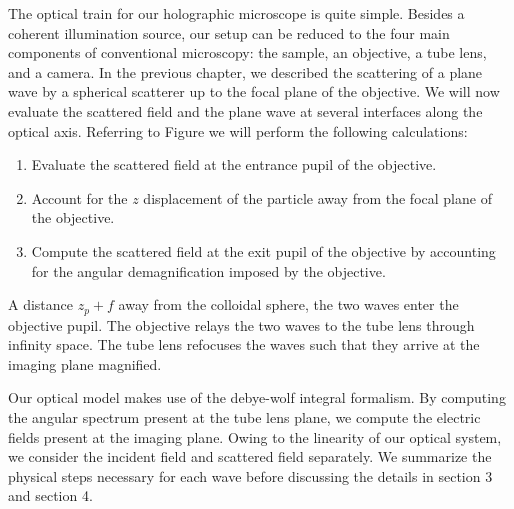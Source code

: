 
The optical train for our holographic microscope is quite simple.
Besides a coherent illumination source, our setup can be reduced to the four
main components of conventional microscopy: the sample, an objective,
a tube lens, and a camera. In the previous chapter, we described the
scattering of a plane wave by a spherical scatterer up to the focal plane
of the objective. We will now evaluate the scattered field and the plane
wave at several interfaces along the optical axis. Referring to
Figure %
we will perform the following calculations:
\begin{enumerate}
\item Evaluate the scattered field at the entrance pupil of the objective.
\item Account for the  $z$ displacement of the particle away from the focal
  plane of the objective.
\item Compute the scattered field at the exit pupil of the objective by accounting
  for the angular demagnification imposed by the objective.
\end{enumerate}


A distance $z_p + f$ away from the colloidal sphere, the two waves enter the
objective pupil. The objective relays the two waves to the tube lens through
infinity space. The tube lens refocuses the waves such that they arrive at the imaging
plane magnified.

Our optical model makes use of the debye-wolf integral formalism. By computing the
angular spectrum present at the tube lens plane, we compute the electric fields
present at the imaging plane. Owing to the linearity of our optical system,
we consider the incident field and scattered field separately. We summarize the physical
steps necessary for each wave before discussing the details in section 3 and section 4.

